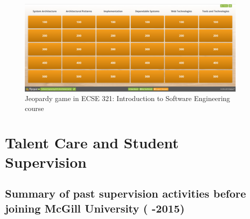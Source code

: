 \documentclass[a4paper,11pt]{report}
\begin{document}
\begin{figure}[htb]
\centering
\includegraphics[width=.8\textwidth]{figures/FlipQuiz}
\caption{Jeopardy game in ECSE 321: Introduction to Software Engineering course}
\label{fig:jeopardy-ecse321}
\end{figure}











\section{Talent Care and Student Supervision}

\subsection{Summary of past supervision activities before joining McGill University ( -2015)}
\end{document}
